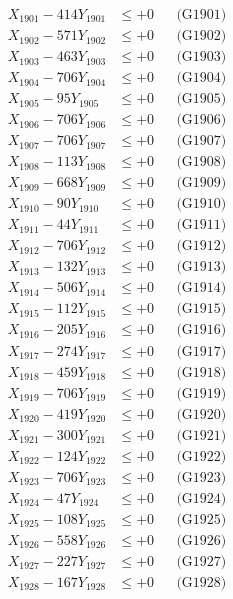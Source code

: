 \documentclass[a4paper,10pt]{article}
\begin{document}
{\begin{align}
\allowbreak
X_{1901} - 414Y_{1901} &\leq +0 && \text{(G1901)} \\
X_{1902} - 571Y_{1902} &\leq +0 && \text{(G1902)} \\
X_{1903} - 463Y_{1903} &\leq +0 && \text{(G1903)} \\
X_{1904} - 706Y_{1904} &\leq +0 && \text{(G1904)} \\
X_{1905} - 95Y_{1905} &\leq +0 && \text{(G1905)} \\
X_{1906} - 706Y_{1906} &\leq +0 && \text{(G1906)} \\
X_{1907} - 706Y_{1907} &\leq +0 && \text{(G1907)} \\
X_{1908} - 113Y_{1908} &\leq +0 && \text{(G1908)} \\
X_{1909} - 668Y_{1909} &\leq +0 && \text{(G1909)} \\
X_{1910} - 90Y_{1910} &\leq +0 && \text{(G1910)} \\
\allowbreak
X_{1911} - 44Y_{1911} &\leq +0 && \text{(G1911)} \\
X_{1912} - 706Y_{1912} &\leq +0 && \text{(G1912)} \\
X_{1913} - 132Y_{1913} &\leq +0 && \text{(G1913)} \\
X_{1914} - 506Y_{1914} &\leq +0 && \text{(G1914)} \\
X_{1915} - 112Y_{1915} &\leq +0 && \text{(G1915)} \\
X_{1916} - 205Y_{1916} &\leq +0 && \text{(G1916)} \\
X_{1917} - 274Y_{1917} &\leq +0 && \text{(G1917)} \\
X_{1918} - 459Y_{1918} &\leq +0 && \text{(G1918)} \\
X_{1919} - 706Y_{1919} &\leq +0 && \text{(G1919)} \\
X_{1920} - 419Y_{1920} &\leq +0 && \text{(G1920)} \\
\allowbreak
X_{1921} - 300Y_{1921} &\leq +0 && \text{(G1921)} \\
X_{1922} - 124Y_{1922} &\leq +0 && \text{(G1922)} \\
X_{1923} - 706Y_{1923} &\leq +0 && \text{(G1923)} \\
X_{1924} - 47Y_{1924} &\leq +0 && \text{(G1924)} \\
X_{1925} - 108Y_{1925} &\leq +0 && \text{(G1925)} \\
X_{1926} - 558Y_{1926} &\leq +0 && \text{(G1926)} \\
X_{1927} - 227Y_{1927} &\leq +0 && \text{(G1927)} \\
X_{1928} - 167Y_{1928} &\leq +0 && \text{(G1928)} \\

\end{align}}
\end{document}
